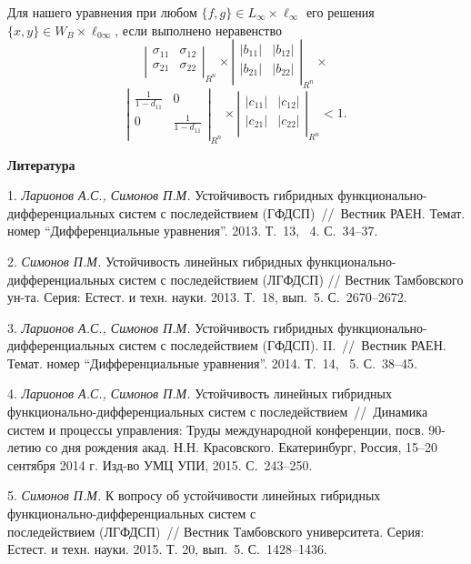 Для нашего уравнения при любом $\{ f,g\} \in L_{\infty}\times \ell_{\infty}$ его решения $\{ x,y\} \in W_{B}\times \ell_{0\infty}$, если выполнено неравенство
$$
\left|\begin{array}{cc}
\sigma_{11} & \sigma_{12} \\
\sigma_{21} & \sigma_{22} \\
\end{array}\right|_{R^n} \times
\left|\begin{array}{cc}
|b_{11}| & |b_{12}| \\
|b_{21}| & |b_{22}| \\
\end{array}\right|_{R^n}\times
$$
$$
\left|\begin{array}{cc}
\frac{1}{1-d_{11}} & 0 \\
0 & \frac{1}{1-d_{11}} \\
\end{array}\right|_{R^n}\times
\left|\begin{array}{cc}
|c_{11}| & |c_{12}| \\
|c_{21}| & |c_{22}| \\
\end{array}\right|_{R^n} < 1.
$$


\smallskip \centerline {\bf Литература} \nopagebreak

1.
{\it Ларионов А.С., Симонов П.М.} Устойчивость гибридных функционально-дифференциальных систем с последействием (ГФДСП)~//~Вестник РАЕН. Темат. номер ``Дифференциальные уравнения''. 2013. Т.~13, \No~4. С.~34--37.

2.
{\it Симонов П.М.}	Устойчивость линейных гибридных фу\-н\-к\-ци\-о\-на\-ль\-но-ди\-ф\-фе\-рен\-ци\-аль\-ных систем с последействием (ЛГФДСП) // Вестник Тамбовского ун-та. Серия: Естест. и техн. науки. 2013. Т.~18, вып.~5. С.~2670--2672.


3.
{\it Ларионов А.С., Симонов П.М.} Устойчивость гибридных функционально-дифференциальных систем с последействием (ГФДСП). II.~//~Вестник РАЕН. Темат. номер ``Дифференциальные уравнения''. 2014. Т.~14, \No~5. С.~38--45.

4.
{\it Ларионов А.С., Симонов П.М.} Устойчивость линейных гибридных функционально-дифференциальных систем с последействием~//~Динамика систем и процессы управления: Труды международной конференции, посв. 90-летию со дня рождения акад. Н.Н. Красовского. Екатеринбург, Россия, 15--20 сентября 2014 г. Изд-во УМЦ УПИ, 2015. С.~243--250.

5.
{\it Симонов П.М.} К вопросу об устойчивости линейных гибридных функционально-дифференциальных систем с\\последействием (ЛГФДСП)~// Вестник Тамбовского университета. Серия: Естест. и техн. науки. 2015. Т. 20, вып.~5. С.~1428--1436.

